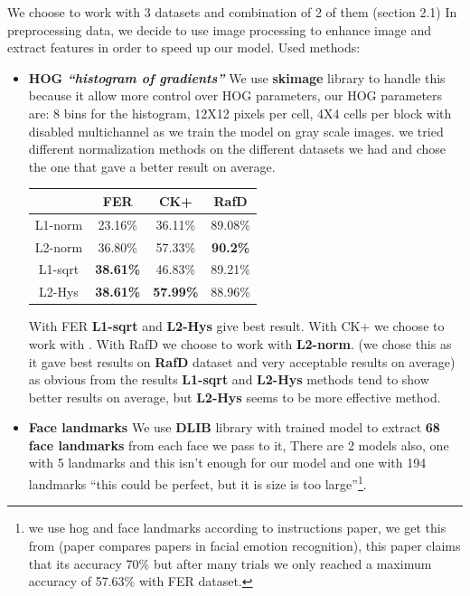 We choose to work with 3 datasets and combination of 2 of them (section 2.1) \newline
In preprocessing data, we decide to use image processing to enhance image and extract features in order to speed up our model. \newline
Used methods: \newline
\begin{itemize}
\item \textbf{HOG \textit{“histogram of gradients”} } We use \textbf{skimage} library to handle this because it allow more control over HOG parameters, our HOG parameters are: 8 bins for the histogram, 12X12 pixels per cell, 4X4 cells per block with disabled multichannel as we train the model on gray scale images.
we tried different normalization methods on the different datasets we had and chose the one that gave a better result on average.

\begin{center}
	\begin{tabular}{ c|c|c|c }
		& FER & CK+ & RafD \\ \hline
		L1-norm & 23.16\% & 36.11\% & 89.08\% \\  
		L2-norm & 36.80\% & 57.33\% & \textbf{90.2\%} \\
		L1-sqrt & \textbf{38.61\%} & 46.83\% & 89.21\% \\
		L2-Hys & \textbf{38.61\%} & \textbf{57.99\%} & 88.96\% \\
	\end{tabular}
\end{center}
With FER \textbf{L1-sqrt} and \textbf{L2-Hys} give best result.\newline
With CK+ we choose to work with  .\newline
With RafD we choose to work with  \textbf{L2-norm}. (we chose this as it gave best results on \textbf{RafD} dataset and very acceptable results on average)\newline
as obvious from the results \textbf{L1-sqrt} and \textbf{L2-Hys} methods tend to show better results on average, but \textbf{L2-Hys} seems to be more effective method.\newline

\item \textbf{Face landmarks } We use \textbf{DLIB} library with trained model to extract \textbf{68 face landmarks} from each face we pass to it, There are 2 models also, one with 5 landmarks and this isn’t enough for our model and one with 194 landmarks “this could be perfect, but it is size is too large”\footnote{
	we use hog and face landmarks according to instructions paper\cite{method_5}, we get this from \cite{state_of_art} (paper compares papers in facial emotion recognition), this paper claims that its accuracy 70\% but after many trials we only reached a maximum accuracy of 57.63\% with FER dataset.
}.


\end{itemize}
